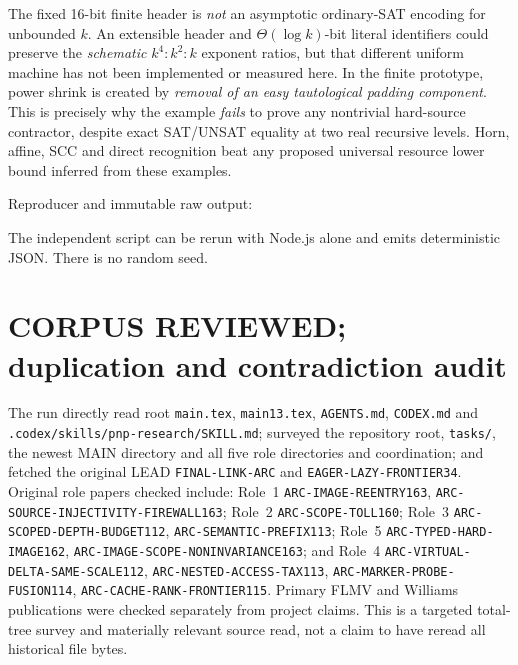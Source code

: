 \documentclass[11pt]{article}
\begin{document}
The fixed 16-bit finite header is \emph{not} an
asymptotic ordinary-SAT encoding for unbounded $k$.
An extensible header and $\Theta(\log k)$-bit
literal identifiers could preserve the \emph{schematic}
$k^4:k^2:k$ exponent ratios, but that
different uniform machine has not been
implemented or measured here. In the finite
prototype, power shrink is created by \emph{removal
of an easy tautological padding component}.
This is precisely why the example \emph{fails}
to prove any nontrivial hard-source contractor,
despite exact SAT/UNSAT equality at two real
recursive levels. Horn, affine, SCC and
direct recognition beat any proposed universal
resource lower bound inferred from these examples.

Reproducer and immutable raw output:
\begin{description}
\item[] 
\item[] 
\end{description}
The independent script can be rerun with Node.js alone
and emits deterministic JSON. There is no random seed.

\section*{CORPUS REVIEWED; duplication and contradiction audit}
The run directly read root \texttt{main.tex},
\texttt{main13.tex}, \texttt{AGENTS.md},
\texttt{CODEX.md} and
\texttt{.codex/skills/pnp-research/SKILL.md};
surveyed the repository root, \texttt{tasks/},
the newest MAIN directory and all five role
directories and coordination; and fetched the
original LEAD \texttt{FINAL-LINK-ARC} and
\texttt{EAGER-LAZY-FRONTIER34}.
Original role papers checked include:
Role~1 \texttt{ARC-IMAGE-REENTRY163},
\texttt{ARC-SOURCE-INJECTIVITY-FIREWALL163};
Role~2 \texttt{ARC-SCOPE-TOLL160};
Role~3 \texttt{ARC-SCOPED-DEPTH-BUDGET112},
\texttt{ARC-SEMANTIC-PREFIX113};
Role~5 \texttt{ARC-TYPED-HARD-IMAGE162},
\texttt{ARC-IMAGE-SCOPE-NONINVARIANCE163};
and Role~4 \texttt{ARC-VIRTUAL-DELTA-SAME-SCALE112},
\texttt{ARC-NESTED-ACCESS-TAX113},
\texttt{ARC-MARKER-PROBE-FUSION114},
\texttt{ARC-CACHE-RANK-FRONTIER115}.
Primary FLMV and Williams publications were
checked separately from project claims.
This is a targeted total-tree survey and
materially relevant source read, not a
claim to have reread all historical file bytes.
\end{document}
